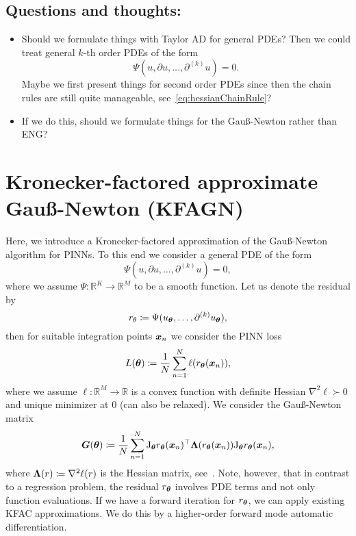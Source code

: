\subsection{Questions and thoughts:}

\begin{itemize}
    \item Should we formulate things with Taylor AD for general PDEs? Then we could treat general $k$-th order PDEs of the form     
    \begin{equation*}
        \Psi(u, \partial u, \dots, \partial^{(k)} u) = 0. 
    \end{equation*}
    Maybe we first present things for second order PDEs since then the chain rules are still quite manageable, see~\eqref{eq:hessianChainRule}? 
    \item If we do this, should we formulate things for the Gauß-Newton rather than ENG?
\end{itemize}

\section{Kronecker-factored approximate Gauß-Newton (KFAGN)}
Here, we introduce a Kronecker-factored approximation of the Gauß-Newton algorithm for PINNs. 
To this end we consider a general PDE of the form
\begin{equation}
    \Psi(u, \partial u, \dots, \partial^{(k)} u) = 0,
\end{equation}
where we assume $\Psi\colon \mathbb R^K\to\mathbb R^M$ to be a smooth function.
Let us denote the residual by 
\begin{equation}
    r_\theta\coloneqq \Psi(u_{\bm{\theta}}, \dots, \partial^{(k)} u_{\bm{\theta}}),
\end{equation} 
then for suitable integration points ${\bm{x}}_n$ we consider the PINN loss
\begin{equation}
    L({\bm{\theta}})\coloneqq \frac1N\sum_{n=1}^N \ell(r_{{\bm{\theta}}}({\bm{x}}_n)),
\end{equation}
where we assume $\ell\colon\mathbb R^M\to\mathbb R$ is a convex function with definite Hessian $\nabla^2\ell\succ0$ and unique minimizer at $0$ (can also be relaxed). 
We consider the Gauß-Newton matrix
\begin{equation}
    {\bm{G}}({\bm{\theta}}) \coloneqq \frac1N\sum_{n=1}^N \mathrm{J}_{\bm{\theta}} r_{\bm{\theta}}({\bm{x}}_n)^\top {\bm{\Lambda}}(r_{\bm{\theta}}({\bm{x}}_n)) \mathrm{J}_{\bm{\theta}} r_{\bm{\theta}}({\bm{x}}_n),
\end{equation}
where ${\bm{\Lambda}}(r)\coloneqq \nabla^2 \ell(r)$ is the Hessian matrix, see~\cite{eschenhagen2023kroneckerfactored}. 
Note, however, that in contrast to a regression problem, the residual $r_{\bm{\theta}}$ involves PDE terms and not only function evaluations. 
If we have a forward iteration for $r_{\bm{\theta}}$, we can apply existing KFAC approximations. 
We do this by a higher-order forward mode automatic differentiation. 

